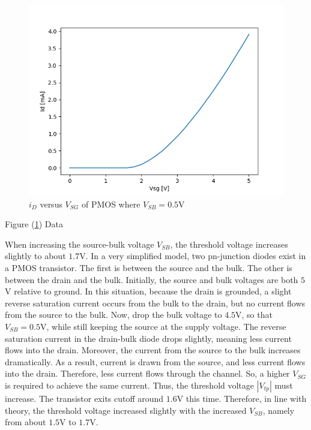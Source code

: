 \FloatBarrier

\begin{figure}[h!]
	\centering
	\includegraphics[scale=0.75]{../images/data_3_b.PNG}
	\caption{$i_{D}$ versus $V_{SG}$ of PMOS where $V_{SB}= 0.5$\si{\volt}}
	\label{fig:data_3_b}
\end{figure}

\FloatBarrier

\FloatBarrier

\begin{table}[h!]
	\centering
	\caption{Figure (\ref{fig:data_3_b}) Data}
	\label{tab:data_3_b}
\end{table}

\FloatBarrier

When increasing the source-bulk voltage $V_{SB}$, the threshold voltage increases slightly to about $1.7$\si{\volt}.
In a very simplified model, two pn-junction diodes exist in a PMOS transistor.
The first is between the source and the bulk.
The other is between the drain and the bulk.
Initially, the source and bulk voltages are both $5$\si{\volt} relative to ground.
In this situation, because the drain is grounded, a slight reverse saturation current occurs from the bulk to the drain, but no current flows from the source to the bulk.
Now, drop the bulk voltage to $4.5$\si{\volt}, so that $V_{SB} = 0.5$\si{\volt}, while still keeping the source at the supply voltage.
The reverse saturation current in the drain-bulk diode drops slightly, meaning less current flows into the drain.
Moreover, the current from the source to the bulk increases dramatically.
As a result, current is drawn from the source, and less current flows into the drain.
Therefore, less current flows through the channel.
So, a higher $V_{SG}$ is required to achieve the same current.
Thus, the threshold voltage $|V_{tp}|$ must increase.
The transistor exits cutoff around $1.6$\si{\volt} this time.
Therefore, in line with theory, the threshold voltage increased slightly with the increased $V_{SB}$, namely from about $1.5$\si{\volt} to $1.7$\si{\volt}.

